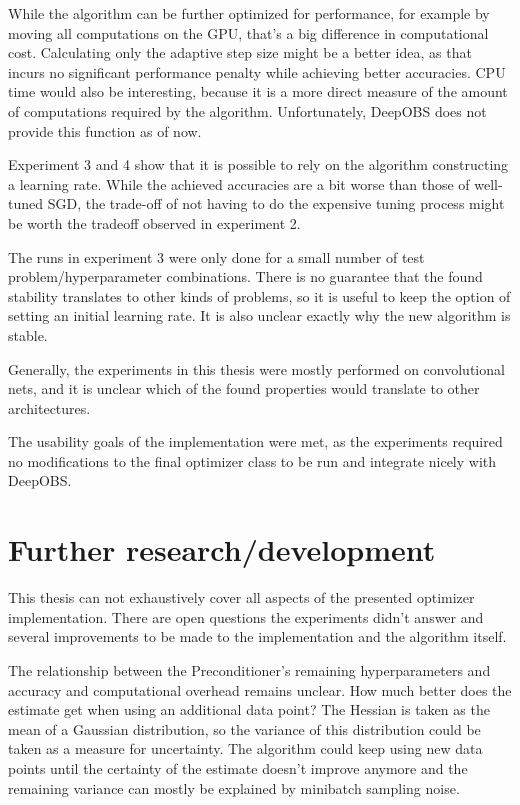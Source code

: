 \documentclass[twoside,12pt,a4paper]{report}
\begin{document}
While the algorithm can be further optimized for performance, for example by moving all computations on the GPU, that's a big difference in computational cost. Calculating only the adaptive step size might be a better idea, as that incurs no significant performance penalty while achieving better accuracies.
CPU time would also be interesting, because it is a more direct measure of the amount of computations required by the algorithm. Unfortunately, DeepOBS does not provide this function as of now.

Experiment 3 and 4 show that it is possible to rely on the algorithm constructing a learning rate. While the achieved accuracies are a bit worse than those of well-tuned SGD, the trade-off of not having to do the expensive tuning process might be worth the tradeoff observed in experiment 2.

The runs in experiment 3 were only done for a small number of test problem/hyperparameter combinations. There is no guarantee that the found stability translates to other kinds of problems, so it is useful to keep the option of setting an initial learning rate. It is also unclear exactly why the new algorithm is stable.

Generally, the experiments in this thesis were mostly performed on convolutional nets, and it is unclear which of the found properties would translate to other architectures.

The usability goals of the implementation were met, as the experiments required no modifications to the final optimizer class to be run and integrate nicely with DeepOBS.

\section{Further research/development}
This thesis can not exhaustively cover all aspects of the presented optimizer implementation. There are open questions the experiments didn't answer and several improvements to be made to the implementation and the algorithm itself.

The relationship between the Preconditioner's remaining hyperparameters and accuracy and computational overhead remains unclear. How much better does the estimate get when using an additional data point? The Hessian is taken as the mean of a Gaussian distribution, so the variance of this distribution could be taken as a measure for uncertainty. The algorithm could keep using new data points until the certainty of the estimate doesn't improve anymore and the remaining variance can mostly be explained by minibatch sampling noise.
\end{document}

